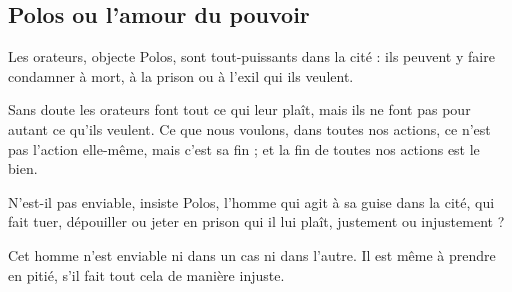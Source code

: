 \subsection*{Polos ou l'amour du pouvoir}


Les orateurs, objecte Polos, sont tout-puissants dans la cité : ils peuvent y faire condamner à mort, à la prison ou à l'exil qui ils veulent.

Sans doute les orateurs font tout ce qui leur plaît, mais ils ne font pas pour autant ce qu'ils veulent. Ce que nous voulons, dans toutes nos actions, ce n'est pas l'action elle-même, mais c'est sa fin ; et la fin de toutes nos actions est le bien.


N'est-il pas enviable, insiste Polos, l'homme qui agit à sa guise dans la cité, qui fait tuer, dépouiller ou jeter en prison qui il lui plaît, justement ou injustement ?

Cet homme n'est enviable ni dans un cas ni dans l'autre. Il est même à prendre en pitié, s'il fait tout cela de manière injuste.%

\begin{comment}
POLOS : Comme si toi-même, Socrate, tu n'aimerais pas mieux avoir la liberté de faire dans l'État ce qui te plairait que d'en être empêché, et comme si, en voyant un homme tuer, dépouiller, mettre aux fers qui il lui plairait, tu ne lui portais pas envie !\\
SOCRATE : Entends-tu qu'il agirait justement ou injustement ?\\
POLOS : De quelque manière qu'il agisse, ne serait-il pas enviable dans un cas comme dans l'autre ?\\
SOCRATE : Ne parle pas ainsi, Polos.\\
POLOS : Pourquoi donc ?\\
SOCRATE : Parce qu'il ne faut pas envier les gens qui ne sont pas enviables, non plus que les malheureux, mais les prendre en pitié.
\end{comment}

